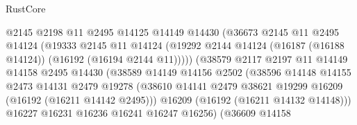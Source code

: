 \begin{lexlean}{RustCore}
\begin{coremodule}
                                  @2145
                                  @2198
                                  @11
                                  @2495
                                  @14125
                                  @14149
                                  @14430
                                  (@36673
                                    @2145
                                    @11
                                    @2495
                                    @14124
                                    (@19333
                                      @2145
                                      @11
                                      @14124
                                      (@19292
                                        @2144
                                        @14124
                                        (@16187 (@16188 @14124))
                                        (@16192 (@16194 @2144 @11)))))
                                  (@38579
                                    @2117
                                    @2197
                                    @11
                                    @14149
                                    @14158
                                    @2495
                                    @14430
                                    (@38589
                                      @14149
                                      @14156
                                      @2502
                                      (@38596
                                        @14148
                                        @14155
                                        @2473
                                        @14131
                                        @2479
                                        @19278
                                        (@38610
                                          @14141
                                          @2479
                                          @38621
                                          @19299
                                          @16209
                                          (@16192 (@16211 @14142 @2495)))
                                        @16209
                                        (@16192 (@16211 @14132 @14148)))
                                      @16227
                                      @16231
                                      @16236
                                      @16241
                                      @16247
                                      @16256)
                                    (@36609
                                      @14158

\end{coremodule}
\end{lexlean}
